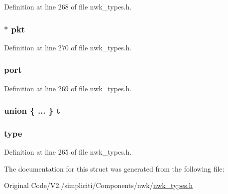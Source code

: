 \-Definition at line 268 of file nwk\-\_\-types.\-h.

\hypertarget{structrcvContext__t_ad103301359467b3f838dbf32b25299a8}{
\subsubsection[{pkt}]{$\ast$ {\bf pkt}}}\label{structrcvContext__t_ad103301359467b3f838dbf32b25299a8}


\-Definition at line 270 of file nwk\-\_\-types.\-h.

\hypertarget{structrcvContext__t_a2fa54f9024782843172506fadbee2ac8}{
\subsubsection[{port}]{ {\bf port}}}\label{structrcvContext__t_a2fa54f9024782843172506fadbee2ac8}


\-Definition at line 269 of file nwk\-\_\-types.\-h.

\hypertarget{structrcvContext__t_a15f73357939d5a39511cda6e8eb5d198}{
\subsubsection[{t}]{\setlength{\rightskip}{0pt plus 5cm}union \{ ... \}   {\bf t}}}\label{structrcvContext__t_a15f73357939d5a39511cda6e8eb5d198}
\hypertarget{structrcvContext__t_a3db35c24c9a9e3bbc08b807e05ad5c58}{
\subsubsection[{type}]{ {\bf type}}}\label{structrcvContext__t_a3db35c24c9a9e3bbc08b807e05ad5c58}


\-Definition at line 265 of file nwk\-\_\-types.\-h.



\-The documentation for this struct was generated from the following file\-:\begin{DoxyCompactItemize}
\item 
\-Original Code/\-V2./simpliciti/\-Components/nwk/\hyperlink{nwk__types_8h}{nwk\-\_\-types.\-h}\end{DoxyCompactItemize}
